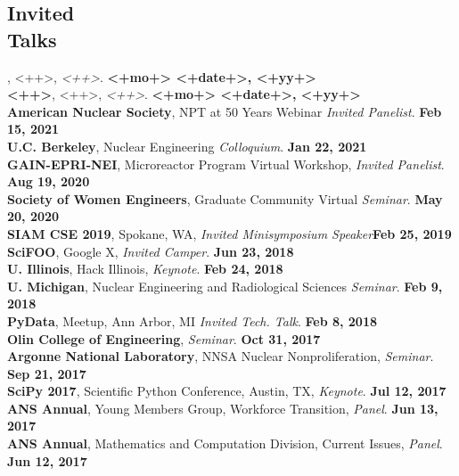 \documentclass[margin,line]{resume}
\begin{document}
\begin{resume}
    \section{\mysidestyle Invited\\Talks}
    \textbf{}, <++>, \emph{<++>}.  \hfill\textbf{<+mo+> <+date+>, <+yy+>}\\
    \textbf{<++>}, <++>, \emph{<++>}.  \hfill\textbf{<+mo+> <+date+>, <+yy+>}\\
    \textbf{American Nuclear Society}, NPT at 50 Years Webinar \emph{Invited Panelist}.  \hfill\textbf{Feb 15, 2021}\\
    \textbf{U.C. Berkeley}, Nuclear Engineering \emph{Colloquium}.  \hfill\textbf{Jan 22, 2021}\\
    \textbf{GAIN-EPRI-NEI}, Microreactor Program Virtual Workshop, \emph{Invited Panelist}.  \hfill\textbf{Aug 19, 2020}\\
    \textbf{Society of Women Engineers}, Graduate Community Virtual \emph{Seminar}.  \hfill\textbf{May 20, 2020}\\
    \textbf{SIAM CSE 2019}, Spokane, WA, \emph{Invited Minisymposium Speaker}\hfill\textbf{Feb 25, 2019}\\
      \textbf{SciFOO}, Google X, \emph{Invited Camper}.  \hfill\textbf{Jun 23, 2018}\\
      \textbf{U. Illinois}, Hack Illinois, \emph{Keynote}.  \hfill\textbf{Feb 24, 2018}\\
      \textbf{U. Michigan}, Nuclear Engineering and Radiological Sciences \emph{Seminar}.  \hfill\textbf{Feb 9, 2018}\\
      \textbf{PyData}, Meetup, Ann Arbor, MI \emph{Invited Tech. Talk}.  \hfill\textbf{Feb 8, 2018}\\
      \textbf{Olin College of Engineering}, \emph{Seminar}.  \hfill\textbf{Oct 31, 2017}\\
      \textbf{Argonne National Laboratory}, NNSA Nuclear Nonproliferation, \emph{Seminar}.  \hfill\textbf{Sep 21, 2017}\\
      \textbf{SciPy 2017}, Scientific Python Conference, Austin, TX, \emph{Keynote}.  \hfill\textbf{Jul 12, 2017}\\
      \textbf{ANS Annual}, Young Members Group, Workforce Transition, \emph{Panel}.  \hfill\textbf{Jun 13, 2017}\\
      \textbf{ANS Annual}, Mathematics and Computation Division, Current Issues, \emph{Panel}.  \hfill\textbf{Jun 12, 2017}\\

\end{resume}
\end{document}
